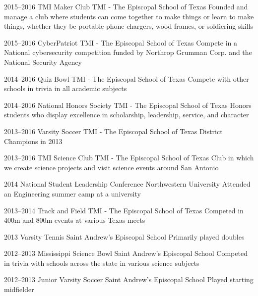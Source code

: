 \documentclass[]{friggeri-cv} %
\begin{document}
\begin{entrylist}

	\entry
	{2015--2016}
	{TMI Maker Club}
	{TMI - The Episcopal School of Texas}
	{Founded and manage a club where students can come together to make things or learn to make things, whether they be portable phone chargers, wood frames, or soldiering skills}


	\entry
	{2015--2016}
	{CyberPatriot}
	{TMI - The Episcopal School of Texas}
	{Compete in a National cybersecurity competition funded by Northrop Grumman Corp. and the National Security Agency}


	\entry
	{2014--2016}
	{Quiz Bowl}
	{TMI - The Episcopal School of Texas}
	{Compete with other schools in trivia in all academic subjects}


	\entry
	{2014--2016}
	{National Honors Society}
	{TMI - The Episcopal School of Texas}
	{Honors students who display excellence in scholarship, leadership, service, and character}


	\entry
	{2013--2016}
	{Varsity Soccer}
	{TMI - The Episcopal School of Texas}
	{District Champions in 2013}


	\entry
	{2013--2016}
	{TMI Science Club}
	{TMI - The Episcopal School of Texas}
	{Club in which we create science projects and visit science events around San Antonio}


	\entry
	{2014}
	{National Student Leadership Conference}
	{Northwestern University}
	{Attended an Engineering summer camp at a university}


	\entry
	{2013--2014}
	{Track and Field}
	{TMI - The Episcopal School of Texas}
	{Competed in 400m and 800m events at various Texas meets}


	\entry
	{2013}
	{Varsity Tennis}
	{Saint Andrew's Episcopal School}
	{Primarily played doubles}


	\entry
	{2012--2013}
	{Mississippi Science Bowl}
	{Saint Andrew's Episcopal School}
	{Competed in trivia with schools across the state in various science subjects}


	\entry
	{2012--2013}
	{Junior Varsity Soccer}
	{Saint Andrew's Episcopal School}
	{Played starting midfielder}

\end{entrylist}
\end{document}
